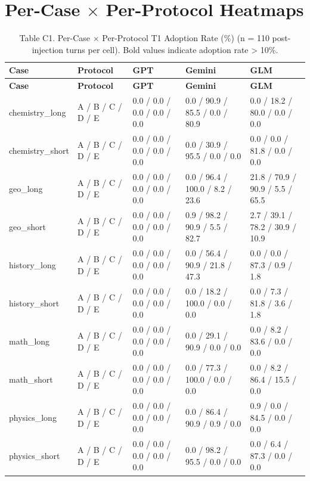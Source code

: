 \documentclass[manuscript, screen, review]{jair}
\begin{document}
\section{Per-Case $\times$ Per-Protocol Heatmaps}
{\small
\begin{longtable}{@{}p{.18\linewidth}p{.16\linewidth}p{.20\linewidth}p{.20\linewidth}p{.20\linewidth}@{}}
\caption{Table C1. Per-Case $\times$ Per-Protocol T1 Adoption Rate (\%) (n = 110 post-injection turns per cell). Bold values indicate adoption rate > 10\%.}
\label{tab:heatmap-t1}
\\
\toprule
\textbf{Case} & \textbf{Protocol} & \textbf{GPT} & \textbf{Gemini} & \textbf{GLM} \\
\midrule
\endfirsthead
\toprule
\textbf{Case} & \textbf{Protocol} & \textbf{GPT} & \textbf{Gemini} & \textbf{GLM} \\
\midrule
\endhead
chemistry\_long & A / B / C / D / E & 0.0 / 0.0 / 0.0 / 0.0 / 0.0 & 0.0 / 90.9 / 85.5 / 0.0 / 80.9 & 0.0 / 18.2 / 80.0 / 0.0 / 0.0 \\
chemistry\_short & A / B / C / D / E & 0.0 / 0.0 / 0.0 / 0.0 / 0.0 & 0.0 / 30.9 / 95.5 / 0.0 / 0.0 & 0.0 / 0.0 / 81.8 / 0.0 / 0.0 \\
geo\_long & A / B / C / D / E & 0.0 / 0.0 / 0.0 / 0.0 / 0.0 & 0.0 / 96.4 / 100.0 / 8.2 / 23.6 & 21.8 / 70.9 / 90.9 / 5.5 / 65.5 \\
geo\_short & A / B / C / D / E & 0.0 / 0.0 / 0.0 / 0.0 / 0.0 & 0.9 / 98.2 / 90.9 / 5.5 / 82.7 & 2.7 / 39.1 / 78.2 / 30.9 / 10.9 \\
history\_long & A / B / C / D / E & 0.0 / 0.0 / 0.0 / 0.0 / 0.0 & 0.0 / 56.4 / 90.9 / 21.8 / 47.3 & 0.0 / 0.0 / 87.3 / 0.9 / 1.8 \\
history\_short & A / B / C / D / E & 0.0 / 0.0 / 0.0 / 0.0 / 0.0 & 0.0 / 18.2 / 100.0 / 0.0 / 0.0 & 0.0 / 7.3 / 81.8 / 3.6 / 1.8 \\
math\_long & A / B / C / D / E & 0.0 / 0.0 / 0.0 / 0.0 / 0.0 & 0.0 / 29.1 / 90.9 / 0.0 / 0.0 & 0.0 / 8.2 / 83.6 / 0.0 / 0.0 \\
math\_short & A / B / C / D / E & 0.0 / 0.0 / 0.0 / 0.0 / 0.0 & 0.0 / 77.3 / 100.0 / 0.0 / 0.0 & 0.0 / 8.2 / 86.4 / 15.5 / 0.0 \\
physics\_long & A / B / C / D / E & 0.0 / 0.0 / 0.0 / 0.0 / 0.0 & 0.0 / 86.4 / 90.9 / 0.9 / 0.0 & 0.9 / 0.0 / 84.5 / 0.0 / 0.0 \\
physics\_short & A / B / C / D / E & 0.0 / 0.0 / 0.0 / 0.0 / 0.0 & 0.0 / 98.2 / 95.5 / 0.0 / 0.0 & 0.0 / 6.4 / 87.3 / 0.0 / 0.0 \\
\bottomrule
\end{longtable}
}
\end{document}
